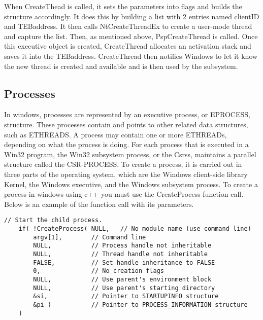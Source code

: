 \documentclass[letterpaper,10pt,titlepage,draftclsnofoot,onecolumn]{IEEEtran}
\begin{document}
When CreateThead is called, it sets the parameters into flags and builds the structure accordingly. It does this by building a list with 2 entries named clientID and TEBaddress. It then calls NtCreateThreadEx to create a user-mode thread and capture the list. Then, as mentioned above, PspCreateThread is called. Once this executive object is created, CreateThread allocates an activation stack and saves it into the TEBaddress. CreateThread then notifies Windows to let it know the new thread is created and available and is then used by the subsystem. 


\subsection{Processes}


In windows, processes are represented by an executive process, or EPROCESS, structure. These processes contain and points to other related data structures, such as ETHREADS. A process may contain one or more ETHREADs, depending on what the process is doing. For each process that is executed in a Win32 program, the Win32 subsystem process, or the Csrss, maintains a parallel structure called the CSR-PROCESS.\cite{Windows} To create a process, it is carried out in three parts of the operating system, which are the Windows client-side library Kernel, the Windows executive, and the Windows subsystem process. To create a process in windows using c++ you must use the CreateProcess function call.  Below is an example of the function call with its parameters. 


\begin{lstlisting}
// Start the child process. 
    if( !CreateProcess( NULL,   // No module name (use command line)
        argv[1],        // Command line
        NULL,           // Process handle not inheritable
        NULL,           // Thread handle not inheritable
        FALSE,          // Set handle inheritance to FALSE
        0,              // No creation flags
        NULL,           // Use parent's environment block
        NULL,           // Use parent's starting directory 
        &si,            // Pointer to STARTUPINFO structure
        &pi )           // Pointer to PROCESS_INFORMATION structure
    ) 
\end{lstlisting}
\end{document}
